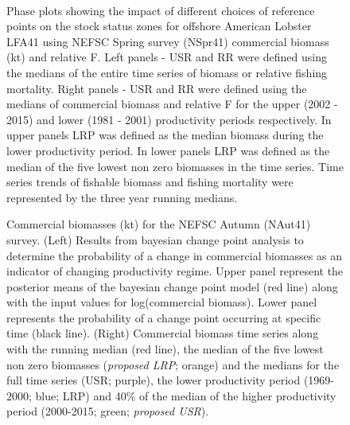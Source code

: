 \documentclass[11pt]{article}
\newcommand{\e}{/backup/bio_data/bio.lobster/figures/} %
\begin{document}
\begin{landscape}
\begin{figure}
\centering
        \\

      \caption{Phase plots showing the impact of different choices of reference points on the stock status zones for offshore American Lobster LFA41 using NEFSC Spring survey (NSpr41) commercial biomass (kt) and relative F. Left panels  - USR and RR were defined using the medians of the entire time series of biomass or relative fishing mortality. Right panels - USR and RR were defined using the medians of commercial biomass and relative F for the upper (2002 - 2015) and lower (1981 - 2001) productivity periods respectively. In upper panels LRP was defined as the median biomass during the lower productivity period. In lower panels LRP was defined as the median of the five lowest non zero biomasses in the time series. Time series trends of fishable biomass and fishing mortality were represented by the three year running medians. }

\end{figure}
\end{landscape}




\begin{landscape}
\begin{figure}
\centering
       \caption{Commercial biomasses (kt) for the NEFSC Autumn (NAut41) survey. (Left) Results from bayesian change point analysis to determine the probability of a change in commercial biomasses as an indicator of changing productivity regime. Upper panel represent the posterior means of the bayesian change point model (red line) along with the input values for log(commercial biomass). Lower panel represents the probability of a change point occurring at specific time (black line). (Right) Commercial biomass time series along with the running median (red line), the median of the five lowest non zero biomasses (\emph{proposed LRP}; orange) and the medians for the full time series (USR; purple), the lower productivity period (1969-2000; blue; LRP) and 40\% of the median of the higher productivity period (2000-2015; green; \emph{proposed USR}). }

\end{figure}
\end{landscape}
\end{document}
